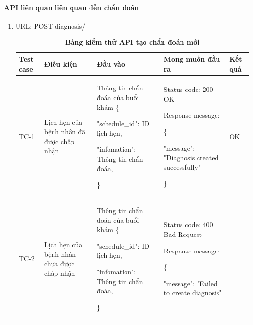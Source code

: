 \paragraph{API liên quan liên quan đến chẩn đoán}
\mbox{}
\begin{enumerate}
	\item URL: POST diagnosis/
	      \begin{xltabular}{\textwidth}{
		      | >{\raggedright\arraybackslash}p{1cm}
		      | >{\raggedright\arraybackslash}p{2.5cm}
		      | >{\raggedright\arraybackslash}X
		      | >{\raggedright\arraybackslash}X
		      | >{\raggedright\arraybackslash}p{1cm}|
		      }
		      \caption{\bfseries \fontsize{12pt}{0pt}\selectfont Bảng kiểm thử API tạo chẩn đoán mới}
		      \\
		      \hline
		      \bfseries Test case    &\bfseries Điều kiện   &\bfseries Đầu vào
		      &\bfseries Mong muốn đầu ra &\bfseries Kết quả\\ \hline


		      TC-1
		      & Lịch hẹn của bệnh nhân đã được chấp nhận
		      & Thông tin chẩn đoán của buổi khám
		      \{

		      "schedule\_id": ID lịch hẹn,

		      "infomation": Thông tin chẩn đoán,

		      \}
		      &

		      Status code: 200 OK

		      Response message:

		      \{

		      "message": "Diagnosis created successfully"

		      \}

		      & OK

		      \\ \hline

		      TC-2
		      & Lịch hẹn của bệnh nhân chưa được chấp nhận
		      & Thông tin chẩn đoán của buổi khám
		      \{

		      "schedule\_id": ID lịch hẹn,

		      "infomation": Thông tin chẩn đoán,

		      \}
		      &

		      Status code: 400 Bad Request

		      Response message:

		      \{

		      "message": "Failed to create diagnosis"


\end{xltabular}
\end{enumerate}
